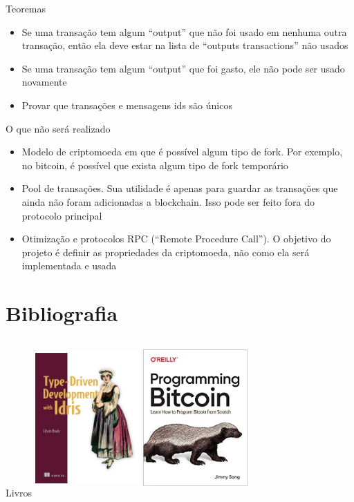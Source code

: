 \documentclass{beamer}
\begin{document}
\begin{frame}{Teoremas}
  \begin{itemize}
    \item Se uma transação tem algum \foreignquote{english}{output} que não foi usado em nenhuma outra transação, 
      então ela deve estar na lista de \foreignquote{english}{outputs transactions} não usados
    \item Se uma transação tem algum \foreignquote{english}{output} que foi gasto, ele não pode ser usado novamente
      \item Provar que transações e mensagens ids são únicos
  \end{itemize}
\end{frame}

\begin{frame}{O que não será realizado}
  \begin{itemize}
    \item Modelo de criptomoeda em que é possível algum tipo de fork. Por exemplo, no bitcoin, é possível que exista algum tipo de fork temporário
    \item Pool de transações. Sua utilidade é apenas para guardar as transações que ainda não foram adicionadas a blockchain. 
    Isso pode ser feito fora do protocolo principal
  \item Otimização e protocolos RPC (\foreignquote{english}{Remote Procedure Call}). O objetivo do projeto é definir as propriedades da criptomoeda, não como ela será implementada e usada
  \end{itemize}
\end{frame}

\section{Bibliografia}

 \begin{frame}{Livros}
    \includegraphics[width=4cm, height=6cm]{TDD}
    \includegraphics[width=4cm, height=6cm]{ProgrammingBitcoin}
 \end{frame}
  
\end{document}
